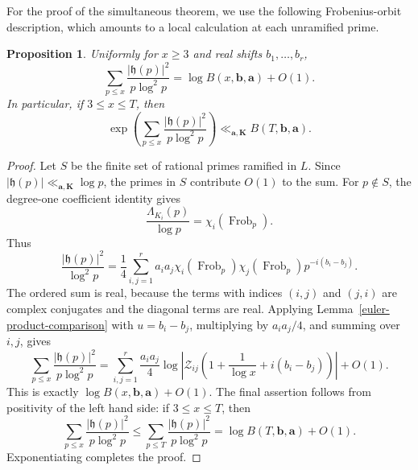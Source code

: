 \documentclass[twoside,reqno,11pt,a4paper]{amsart}
\numberwithin{equation}{section}
\theoremstyle{plain}
\newtheorem{prop}[thm]{Proposition}
\theoremstyle{definition}
\theoremstyle{remark}
\DeclareMathOperator{\Frob}{Frob}
\newcommand{\calZ}{\mathcal Z}
\renewcommand{\le}{\leqslant}
\renewcommand{\geq}{\geqslant}
\begin{document}
For the proof of the simultaneous theorem, we use the following Frobenius-orbit description, which amounts to a local calculation at each unramified prime.
\begin{prop}\label{frobenius-orbit-product}
Uniformly for $x\geq3$ and real shifts $b_1,\ldots,b_r$,
\begin{equation*}
        \sum_{p\le  x}\frac{|\mathfrak h(p)|^2}{p\log^2p}
        =
        \log B(x,\mathbf b,\mathbf a)+O(1).
\end{equation*}
In particular, if $3\le  x\le  T$, then
\begin{equation*}
        \exp\left(\sum_{p\le  x}\frac{|\mathfrak h(p)|^2}{p\log^2p}\right)
        \ll_{\mathbf a,\mathbf K} B(T,\mathbf b,\mathbf a).
\end{equation*}
\end{prop}
\begin{proof}
Let $S$ be the finite set of rational primes ramified in $L$.  Since $|\mathfrak h(p)|\ll_{\mathbf a,\mathbf K}\log p$, the primes in $S$ contribute $O(1)$ to the sum.  For $p\notin S$, the degree-one coefficient identity gives
\begin{equation*}
        \frac{\Lambda_{K_i}(p)}{\log p}=\chi_i(\Frob_p).
\end{equation*}
Thus
\begin{equation*}
        \frac{|\mathfrak h(p)|^2}{\log^2p}
        =
        \frac14\sum_{i,j=1}^r
        a_i a_j\chi_i(\Frob_p)\chi_j(\Frob_p)p^{-i(b_i-b_j)}.
\end{equation*}
The ordered sum is real, because the terms with indices $(i,j)$ and $(j,i)$ are complex conjugates and the diagonal terms are real.  Applying Lemma~\ref{euler-product-comparison} with $u=b_i-b_j$, multiplying by $a_i a_j/4$, and summing over $i,j$, gives
\begin{equation*}
        \sum_{p\le  x}\frac{|\mathfrak h(p)|^2}{p\log^2p}
        =
        \sum_{i,j=1}^r\frac{a_i a_j}{4}
        \log\left|\calZ_{ij}\left(1+\frac1{\log x}+i(b_i-b_j)\right)\right|+O(1).
\end{equation*}
This is exactly $\log B(x,\mathbf b,\mathbf a)+O(1)$.  The final assertion follows from positivity of the left hand side: if $3\le  x\le  T$, then
\begin{equation*}
        \sum_{p\le  x}\frac{|\mathfrak h(p)|^2}{p\log^2p}
        \le
        \sum_{p\le  T}\frac{|\mathfrak h(p)|^2}{p\log^2p}
        =
        \log B(T,\mathbf b,\mathbf a)+O(1).
\end{equation*}
Exponentiating completes the proof.
\end{proof}
\end{document}
